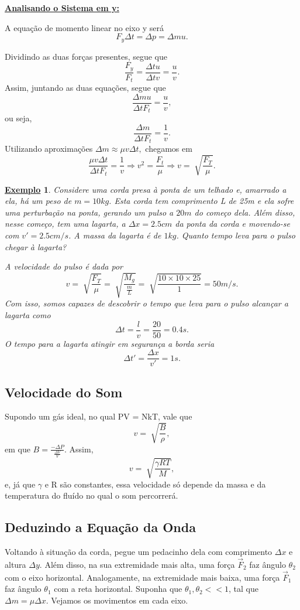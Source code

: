 \documentclass{article}
\newtheorem{example}{\underline{Exemplo}}
\begin{document}
\underline{\textbf{Analisando o Sistema em y:}}

A equação de momento linear no eixo y será 
\[
  F_{y}\Delta t = \Delta p = \Delta mu.
\]

Dividindo as duas forças presentes, segue que 
\[
  \frac{F_{y}}{F_{t}} = \frac{\Delta tu}{\Delta tv} = \frac{u}{v}.
\]  
Assim, juntando as duas equações, segue que 
\[
  \frac{\Delta m u}{\Delta t F_{t}} = \frac{u}{v},
\]
ou seja, 
\[
  \frac{\Delta m}{\Delta t F_{t}} = \frac{1}{v}.
\]
Utilizando aproximações \(\Delta m\approx \mu v\Delta t,\) chegamos em 
\[
  \frac{\mu v\Delta t}{\Delta t F_{t}} = \frac{1}{v} \Rightarrow v^{2}=\frac{F_{t}}{\mu} \Rightarrow v = \sqrt[]{\frac{F_{T}}{\mu}}.
\]
\begin{example}
  Considere uma corda presa à ponta de um telhado e, amarrado a ela, há um peso de \(m=10kg\). Esta corda
  tem comprimento L de 25m e ela sofre uma perturbação na ponta, gerando um pulso a \(20m \) do começo dela. Além disso,
  nesse começo, tem uma lagarta, a \(\Delta x = 2.5cm\) da ponta da corda e movendo-se com \(v'=2.5cm/s\). A massa da
  lagarta é de \(1kg\). Quanto tempo leva para o pulso chegar à lagarta?

  A velocidade do pulso é dada por 
  \[
    v = \sqrt[]{\frac{F_{T}}{\mu}}=\sqrt[]{\frac{M_{g}}{\frac{m}{L}}} = \sqrt[]{\frac{10\times 10\times 25}{1}}=50m/s.
  \]
  Com isso, somos capazes de descobrir o tempo que leva para o pulso alcançar a lagarta como
  \[
    \Delta t = \frac{l}{v} = \frac{20}{50} = 0.4s.
  \]
  O tempo para a lagarta atingir em segurança a borda seria 
  \[
    \Delta t' = \frac{\Delta x}{v'} = 1s.
  \]
\end{example}
\subsection{Velocidade do Som}
Supondo um gás ideal, no qual PV = NkT, vale que 
\[
  v = \sqrt[]{\frac{B}{\rho }},
\]
em que \(B = \frac{-\Delta P}{\frac{\Delta V}{V}}.\) Assim, 
\[
  v = \sqrt[]{\frac{\gamma RT}{M}},
\]
e, já que \(\gamma \) e R são constantes, essa velocidade só depende da massa e da temperatura do fluído no qual
o som percorrerá.
\subsection{Deduzindo a Equação da Onda}
Voltando à situação da corda, pegue um pedacinho dela com comprimento \(\Delta x\) e altura \(\Delta y\). Além disso,
na sua extremidade mais alta, uma força \(\vec{F}_{2}\) faz ângulo \(\theta_{2}\) com o eixo horizontal. Analogamente,
na extremidade mais baixa, uma força \(\vec{F}_{1}\) faz ângulo \(\theta_{1}\) com a reta horizontal. Suponha que
\(\theta_{1}, \theta_{2} << 1\), tal que \(\Delta m = \mu\Delta x.\) Vejamos os movimentos em cada eixo.
\end{document}
